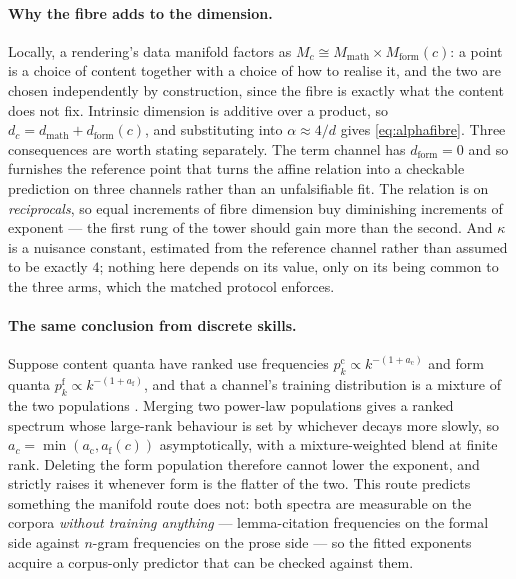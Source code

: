 \paragraph{Why the fibre adds to the dimension.}
Locally, a rendering's data manifold factors as
\(M_c \cong M_{\mathrm{math}} \times M_{\mathrm{form}}(c)\):
a point is a choice of content together with a choice of how to realise it, and
the two are chosen independently by construction, since the fibre is exactly
what the content does not fix.
Intrinsic dimension is additive over a product, so
\(d_c = d_{\mathrm{math}} + d_{\mathrm{form}}(c)\), and substituting into
\(\alpha \approx 4/d\) \citep{sharma2022manifold} gives \cref{eq:alphafibre}.
Three consequences are worth stating separately.
The term channel has \(d_{\mathrm{form}} = 0\) and so furnishes the reference
point that turns the affine relation into a checkable prediction on three
channels rather than an unfalsifiable fit.
The relation is on \emph{reciprocals}, so equal increments of fibre dimension
buy diminishing increments of exponent --- the first rung of the tower should
gain more than the second.
And \(\kappa\) is a nuisance constant, estimated from the reference channel
rather than assumed to be exactly \(4\);
nothing here depends on its value, only on its being common to the three arms,
which the matched protocol enforces.

\paragraph{The same conclusion from discrete skills.}
Suppose content quanta have ranked use frequencies
\(p^{\mathrm{c}}_k \propto k^{-(1+a_{\mathrm{c}})}\) and form quanta
\(p^{\mathrm{f}}_k \propto k^{-(1+a_{\mathrm{f}})}\), and that a channel's
training distribution is a mixture of the two populations
\citep{michaud2023quantization}.
Merging two power-law populations gives a ranked spectrum whose large-rank
behaviour is set by whichever decays more slowly, so
\(a_c = \min(a_{\mathrm{c}}, a_{\mathrm{f}}(c))\) asymptotically, with a
mixture-weighted blend at finite rank.
Deleting the form population therefore cannot lower the exponent, and strictly
raises it whenever form is the flatter of the two.
This route predicts something the manifold route does not:
both spectra are measurable on the corpora \emph{without training anything} ---
lemma-citation frequencies on the formal side against \(n\)-gram frequencies on
the prose side --- so the fitted exponents acquire a corpus-only predictor that
can be checked against them.

